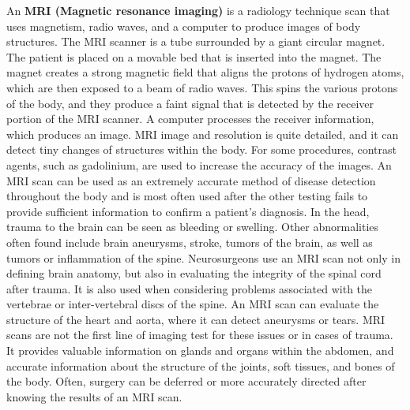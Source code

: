 An \textbf{  MRI (Magnetic resonance imaging) } is a radiology technique scan that uses magnetism, radio waves, and a computer to produce images of body structures. The MRI scanner is a tube surrounded by a giant circular magnet. The patient is placed on a movable bed that is inserted into the magnet. The magnet creates a strong magnetic field that aligns the protons of hydrogen atoms, which are then exposed to a beam of radio waves. This spins the various protons of the body, and they produce a faint signal that is detected by the receiver portion of the MRI scanner. A computer processes the receiver information, which produces an image.
MRI image and resolution is quite detailed, and it can detect tiny changes of structures within the body. For some procedures, contrast agents, such as gadolinium, are used to increase the accuracy of the images. \newline  An MRI scan can be used as an extremely accurate method of disease detection throughout the body and is most often used after the other testing fails to provide sufficient information to confirm a patient's diagnosis. In the head, trauma to the brain can be seen as bleeding or swelling. Other abnormalities often found include brain aneurysms, stroke, tumors of the brain, as well as tumors or inflammation of the spine.  \newline Neurosurgeons use an MRI scan not only in defining brain anatomy, but also in evaluating the integrity of the spinal cord after trauma. It is also used when considering problems associated with the vertebrae or inter-vertebral discs of the spine. An MRI scan can evaluate the structure of the heart and aorta, where it can detect aneurysms or tears. MRI scans are not the first line of imaging test for these issues or in cases of trauma.  \newline It provides valuable information on glands and organs within the abdomen, and accurate information about the structure of the joints, soft tissues, and bones of the body. Often, surgery can be deferred or more accurately directed after knowing the results of an MRI scan.




